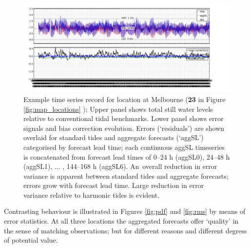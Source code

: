 \begin{figure}[H]
    \centering
    \includegraphics[width=\textwidth]{figures/plots/0026_plot_timeseries.png}
    \caption{ Example time series record for location at Melbourne (\textbf{23} in Figure \ref{fig:map_locations} ); Upper panel shows total still water levels relative to conventional tidal benchmarks. Lower panel shows error signals and bias correction evolution.  Errors (`residuals') are shown overlaid for standard tides and aggregate forecasts (`aggSL') categorised by forecast lead time;  each continuous aggSL timeseries is concatenated from forecast lead times of 0--24 h (aggSL0), 24--48 h (aggSL1), ... , 144--168 h (aggSL6).  An~overall reduction in error variance is apparent between standard tides and aggregate forecasts; errors grow with forecast lead time.   
    Large reduction in error variance relative to harmonic tides is evident.}
\label{fig:ts_melb}
\end{figure}   


Contrasting behaviour is illustrated in Figures \ref{fig:pdf} and \ref{fig:rms} by means of error statistics.
At all three locations the aggregated forecasts offer `quality' in the sense of matching observations; but for different reasons and different degress of potential value. 

